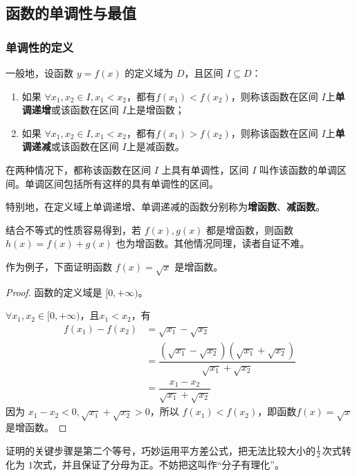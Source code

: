 \documentclass[a4paper,openany]{ctexbook}
\begin{document}
\subsection{函数的单调性与最值}

\subsubsection{单调性的定义}

一般地，设函数 \(y=f(x)\) 的定义域为 \(D\)，且区间 \(I \subseteq D\)：
\begin{enumerate}
    \item 如果 \(\forall x_1,x_2 \in I,x_1<x_2\)，都有\(f(x_1)<f(x_2)\)，则称该函数在区间 \(I\)上\textbf{单调递增}或该函数在区间 \(I\)上是增函数；
    \item 如果 \(\forall x_1,x_2 \in I,x_1<x_2\)，都有\(f(x_1)>f(x_2)\)，则称该函数在区间 \(I\)上\textbf{单调递减}或该函数在区间 \(I\)上是减函数。
\end{enumerate}

在两种情况下，都称该函数在区间 \(I\) 上具有单调性，区间 \(I\) 叫作该函数的单调区间。单调区间包括所有这样的具有单调性的区间。

特别地，在定义域上单调递增、单调递减的函数分别称为\textbf{增函数}、\textbf{减函数}。

结合不等式的性质容易得到，若 \(f(x),g(x)\) 都是增函数，则函数 \(h(x)=f(x)+g(x)\) 也为增函数。其他情况同理，读者自证不难。

作为例子，下面证明函数 \(f(x)=\sqrt{x}\) 是增函数。

\begin{proof}
    函数的定义域是 \([0,+\infty )\)。

    \(\forall x_1,x_2 \in [0,+\infty )\)，且\(x_1<x_2\)，有
    \begin{align*}
        f(x_1)-f(x_2) & =\sqrt{x_1}-\sqrt{x_2}                                                         \\
                      & =\dfrac{(\sqrt{x_1}-\sqrt{x_2})(\sqrt{x_1}+\sqrt{x_2})}{\sqrt{x_1}+\sqrt{x_2}} \\
                      & =\dfrac{x_1-x_2}{\sqrt{x_1}+\sqrt{x_2}}
    \end{align*}
    因为 \(x_1-x_2<0,\sqrt{x_1}+\sqrt{x_2}>0\)，所以 \(f(x_1)<f(x_2)\)，即函数\(f(x)=\sqrt{x}\) 是增函数。
\end{proof}

证明的关键步骤是第二个等号，巧妙运用平方差公式，把无法比较大小的\(1\over 2\)次式转化为 \(1\)次式，并且保证了分母为正。不妨把这叫作“分子有理化”。
\end{document}
